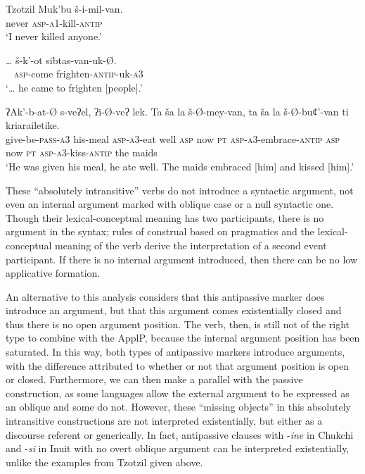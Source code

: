 \documentclass[output=paper,colorlinks,citecolor=brown,modfonts,nonflat]{langsci/langscibook}
\begin{document}
\ea%
     Tzotzil \citep{Aissen1983} \label{ex:basilico:16}
   \ea \label{ex:basilico:16a}
   \gll Muk’bu š-i-mil-van.\\
         never \textsc{asp}-\textsc{a1}-kill-\textsc{antip}\\
   \glt `I never killed anyone.'

   \ex \label{ex:basilico:16b}
   \gll  … š-k’-ot sibtas-van-uk-Ø.\\
   ~ \textsc{asp}-come  frighten-\textsc{antip}-uk-\textsc{a3}\\
   \glt `… he came to frighten [people].'

   \ex \label{ex:basilico:16c}
   \gll  ʔAk’-b-at-Ø s-veʔel, ʔi-Ø-veʔ lek. Ta ša la š-Ø-mey-van, ta ša la š-Ø-buȼ’-van ti kriarailetike. \\
   give-be-\textsc{pass}-\textsc{a3} his-meal \textsc{asp}-\textsc{a3}-eat well  \textsc{asp} now  \textsc{pt} \textsc{asp}-\textsc{a3}-embrace-\textsc{antip} \textsc{asp} now \textsc{pt} \textsc{asp}-\textsc{a3}-kiss-\textsc{antip} the maids\\
   \glt `He was given his meal, he ate well. The maids embraced [him] and kissed [him].'
   \z
   \z

These ``absolutely intransitive'' verbs do not introduce a syntactic argument, not even an internal argument marked with oblique case or a null syntactic one. Though their lexical-conceptual meaning has two participants, there is no argument in the syntax; rules of construal based on pragmatics and the lexical-conceptual meaning of the verb derive the interpretation of a second event participant. If there is no internal argument introduced, then there can be no low applicative formation.

An alternative to this analysis considers that this antipassive marker does introduce an argument, but that this argument comes existentially closed and thus there is no open argument position. The verb, then, is still not of the right type to combine with the ApplP, because the internal argument position has been saturated. In this way, both types of antipassive markers introduce arguments, with the difference attributed to whether or not that argument position is open or closed. Furthermore, we can then make a parallel with the passive construction, as some languages allow the external argument to be expressed as an oblique and some do not. However, these ``missing objects'' in this absolutely intransitive constructions are not interpreted existentially, but either as a discourse referent or generically. In fact, antipassive clauses with -\textit{ine} in Chukchi and -\textit{si} in Inuit with no overt oblique argument can be interpreted existentially, unlike the examples from Tzotzil given above.
\end{document}
